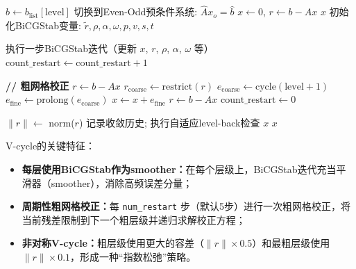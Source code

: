 \documentclass[11pt,a4paper]{article}
\begin{document}
\begin{algorithm}[h]
\caption{MultiGrid V-Cycle}
\label{alg:vcycle}
\begin{algorithmic}[1]
    \State $b \gets b_{\text{list}}[\text{level}]$
        \State 切换到Even-Odd预条件系统: $\hat{A} x_o = \hat{b}$
    \EndIf
    \State $x \gets 0$, $r \gets b - A x$
     \Return $x$
    \EndIf
    \State 初始化BiCGStab变量: $\tilde{r}, \rho, \alpha, \omega, p, v, s, t$

        \State 执行一步BiCGStab迭代（更新 $x$, $r$, $\rho$, $\alpha$, $\omega$ 等）
        \State $\text{count\_restart} \gets \text{count\_restart} + 1$

            \State \textbf{// 粗网格校正}
            \State $r \gets b - A x$  
            \State $r_{\text{coarse}} \gets \text{restrict}(r)$
            \State $e_{\text{coarse}} \gets \text{cycle}(\text{level}+1)$
            \State $e_{\text{fine}} \gets \text{prolong}(e_{\text{coarse}})$
            \State $x \gets x + e_{\text{fine}}$
            \State $r \gets b - A x$
            \State $\text{count\_restart} \gets 0$
        \EndIf

        \State $\|r\| \gets$ norm($r$)
            \State 记录收敛历史; 执行自适应level-back检查
        \EndIf
         \Return $x$
        \EndIf
    \EndFor
    \State \Return $x$
\EndFunction
\end{algorithmic}
\end{algorithm}

V-cycle的关键特征：
\begin{itemize}
    \item \textbf{每层使用BiCGStab作为smoother：}在每个层级上，BiCGStab迭代充当平滑器（smoother），消除高频误差分量；
    \item \textbf{周期性粗网格校正：}每 \texttt{num\_restart} 步（默认5步）进行一次粗网格校正，将当前残差限制到下一个粗层级并递归求解校正方程；
    \item \textbf{非对称V-cycle：}粗层级使用更大的容差（$\|r\| \times 0.5$）和最粗层级使用 $\|r\| \times 0.1$，形成一种``指数松弛''策略。
\end{itemize}
\end{document}

